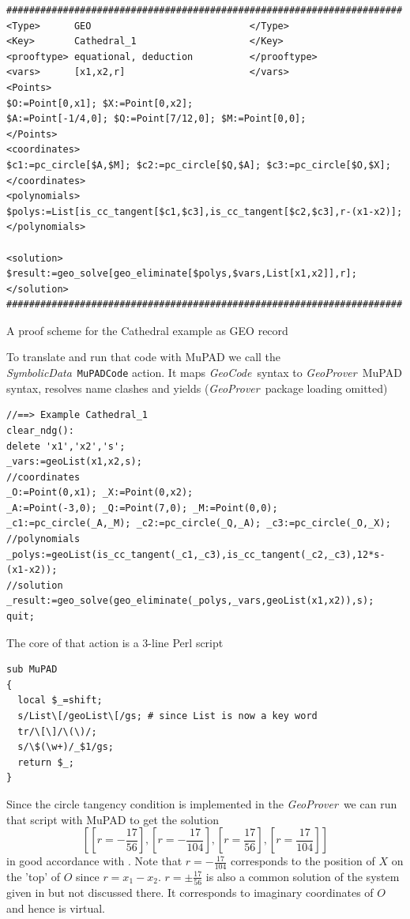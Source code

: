 \documentclass[11pt]{article}
\newcommand{\GC}{\textit{Geo\-Code}}
\newcommand{\GP}{\textit{Geo\-Prover}}
\newcommand{\SD}{\textit{Symbolic\-Data}}
\begin{document}
\begin{table}[p]\label{table:3}{
\begin{verbatim}
######################################################################
<Type>      GEO                            </Type>
<Key>       Cathedral_1                    </Key>
<prooftype> equational, deduction          </prooftype>
<vars>      [x1,x2,r]                      </vars>
<Points>
$O:=Point[0,x1]; $X:=Point[0,x2]; 
$A:=Point[-1/4,0]; $Q:=Point[7/12,0]; $M:=Point[0,0];
</Points>
<coordinates> 
$c1:=pc_circle[$A,$M]; $c2:=pc_circle[$Q,$A]; $c3:=pc_circle[$O,$X];
</coordinates>
<polynomials> 
$polys:=List[is_cc_tangent[$c1,$c3],is_cc_tangent[$c2,$c3],r-(x1-x2)];
</polynomials> 

<solution>
$result:=geo_solve[geo_eliminate[$polys,$vars,List[x1,x2]],r];
</solution>
######################################################################
\end{verbatim}}
\centerline{A proof scheme for the Cathedral example
\cite[5.3]{Kapur_97a} as GEO record}
\end{table}

To translate and run that code with MuPAD we call the \SD\ {\tt MuPADCode}
action. It maps \GC\ syntax to \GP\ MuPAD syntax, resolves name clashes and
yields (\GP\ package loading omitted)
\begin{verbatim}
//==> Example Cathedral_1
clear_ndg():
delete 'x1','x2','s';
_vars:=geoList(x1,x2,s);
//coordinates
_O:=Point(0,x1); _X:=Point(0,x2); 
_A:=Point(-3,0); _Q:=Point(7,0); _M:=Point(0,0);
_c1:=pc_circle(_A,_M); _c2:=pc_circle(_Q,_A); _c3:=pc_circle(_O,_X);
//polynomials
_polys:=geoList(is_cc_tangent(_c1,_c3),is_cc_tangent(_c2,_c3),12*s-(x1-x2));
//solution
_result:=geo_solve(geo_eliminate(_polys,_vars,geoList(x1,x2)),s);
quit;
\end{verbatim}
The core of that action is a 3-line Perl script
\begin{verbatim}
sub MuPAD 
{
  local $_=shift;
  s/List\[/geoList\[/gs; # since List is now a key word 
  tr/\[\]/\(\)/;
  s/\$(\w+)/_$1/gs; 
  return $_;
}
\end{verbatim}%
Since the circle tangency condition is implemented in the \GP\ we can run that
script with MuPAD to get the solution
\[\left[\left[r = -\frac{17}{56}\right], \left[r =
    -\frac{17}{104}\right], \left[r = \frac{17}{56}\right], \left[r =
    \frac{17}{104}\right]\right] \] in good accordance with \cite{Kapur_97a}.
Note that $r= -\frac{17}{104}$ corresponds to the position of $X$ on the 'top'
of $O$ since $r=x_1-x_2$. $r =\pm\frac{17}{56}$ is also a common solution of
the system given in \cite{Kapur_97a} but not discussed there. It corresponds
to imaginary coordinates of $O$ and hence is virtual.
\medskip
\end{document}
